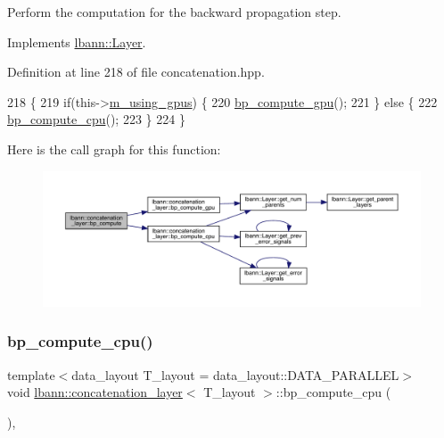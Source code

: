 Perform the computation for the backward propagation step. 

Implements \hyperlink{classlbann_1_1Layer_a7442e01f9ee1294df2de811efcf5171e}{lbann\+::\+Layer}.



Definition at line 218 of file concatenation.\+hpp.


\begin{DoxyCode}
218                              \{
219     \textcolor{keywordflow}{if}(this->\hyperlink{classlbann_1_1Layer_af7881cb5eff5207c15fa835d65462e8f}{m\_using\_gpus}) \{
220       \hyperlink{classlbann_1_1concatenation__layer_aa024e4ba8d10aec75c89075e6e0cc28d}{bp\_compute\_gpu}();
221     \} \textcolor{keywordflow}{else} \{
222       \hyperlink{classlbann_1_1concatenation__layer_a530ff478d02f3d69baf8432473979d00}{bp\_compute\_cpu}();
223     \}
224   \}
\end{DoxyCode}
Here is the call graph for this function\+:\nopagebreak
\begin{figure}[H]
\begin{center}
\leavevmode
\includegraphics[width=350pt]{classlbann_1_1concatenation__layer_abd2a2a3aa260646c98d842993fee6247_cgraph}
\end{center}
\end{figure}
\mbox{\label{classlbann_1_1concatenation__layer_a530ff478d02f3d69baf8432473979d00}} 
\subsubsection{\texorpdfstring{bp\+\_\+compute\+\_\+cpu()}{bp\_compute\_cpu()}}
{\footnotesize\ttfamily template$<$data\+\_\+layout T\+\_\+layout = data\+\_\+layout\+::\+D\+A\+T\+A\+\_\+\+P\+A\+R\+A\+L\+L\+EL$>$ \\
void \hyperlink{classlbann_1_1concatenation__layer}{lbann\+::concatenation\+\_\+layer}$<$ T\+\_\+layout $>$\+::bp\+\_\+compute\+\_\+cpu (\begin{DoxyParamCaption}{ }\end{DoxyParamCaption})\hspace{0.3cm}{\ttfamily [inline]}, {\ttfamily [protected]}}



